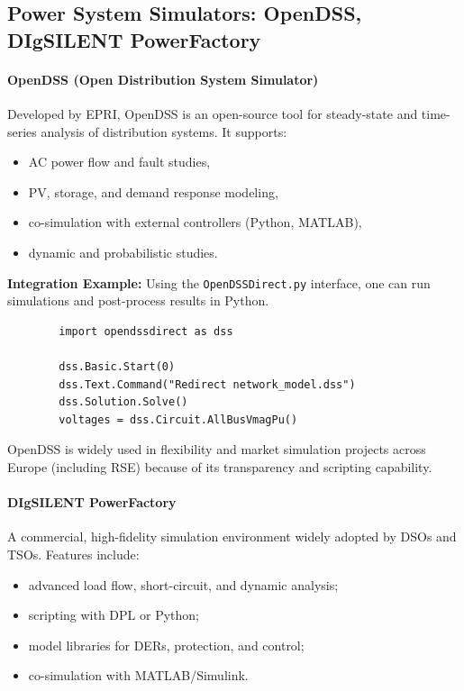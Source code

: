 \documentclass[11pt]{article}
\begin{document}
	
	\subsection{Power System Simulators: OpenDSS, DIgSILENT PowerFactory}
	
	\paragraph{OpenDSS (Open Distribution System Simulator)}
	
	Developed by EPRI, OpenDSS is an open-source tool for steady-state and time-series analysis of distribution systems.  
	It supports:
	\begin{itemize}
		\item AC power flow and fault studies,
		\item PV, storage, and demand response modeling,
		\item co-simulation with external controllers (Python, MATLAB),
		\item dynamic and probabilistic studies.
	\end{itemize}
	
	\textbf{Integration Example:}  
	Using the \texttt{OpenDSSDirect.py} interface, one can run simulations and post-process results in Python.
	
	\begin{verbatim}
		import opendssdirect as dss
		
		dss.Basic.Start(0)
		dss.Text.Command("Redirect network_model.dss")
		dss.Solution.Solve()
		voltages = dss.Circuit.AllBusVmagPu()
	\end{verbatim}
	
	OpenDSS is widely used in flexibility and market simulation projects across Europe (including RSE) because of its transparency and scripting capability.
	
	\paragraph{DIgSILENT PowerFactory}
	
	A commercial, high-fidelity simulation environment widely adopted by DSOs and TSOs.  
	Features include:
	\begin{itemize}
		\item advanced load flow, short-circuit, and dynamic analysis;
		\item scripting with DPL or Python;
		\item model libraries for DERs, protection, and control;
		\item co-simulation with MATLAB/Simulink.
	\end{itemize}
	
\end{document}
